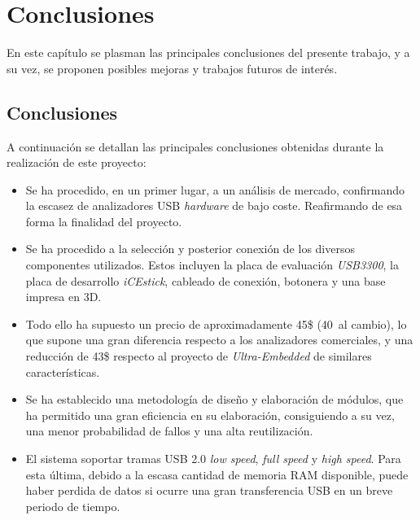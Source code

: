 \chapter{Conclusiones}
\label{ch:conclusiones}

En este capítulo se plasman las principales conclusiones del presente trabajo, y a su vez, se proponen posibles mejoras y trabajos futuros de interés.

\section{Conclusiones}
A continuación se detallan las principales conclusiones obtenidas durante la realización de este proyecto:

\begin{itemize}
    \item Se ha procedido, en un primer lugar, a un análisis de mercado, confirmando la escasez de analizadores USB \emph{hardware} de bajo coste. Reafirmando de esa forma la finalidad del proyecto.
    
    \item Se ha procedido a la selección y posterior conexión de los diversos componentes utilizados. Estos incluyen la placa de evaluación \emph{USB3300}, la placa de desarrollo \emph{iCEstick}, cableado de conexión, botonera y una base impresa en 3D.
    
    \item Todo ello ha supuesto un precio de aproximadamente 45\$ (40\texteuro~al cambio), lo que supone una gran diferencia respecto a los analizadores comerciales, y una reducción de 43\$ respecto al proyecto de \emph{Ultra-Embedded} de similares características.
    
    \item Se ha establecido una metodología de diseño y elaboración de módulos, que ha permitido una gran eficiencia en su elaboración, consiguiendo a su vez, una menor probabilidad de fallos y una alta reutilización.
    
    \item El sistema soportar tramas USB 2.0 \emph{low speed}, \emph{full speed} y \emph{high speed}. Para esta última, debido a la escasa cantidad de memoria RAM disponible, puede haber perdida de datos si ocurre una gran transferencia USB en un breve periodo de tiempo.


\end{itemize}
